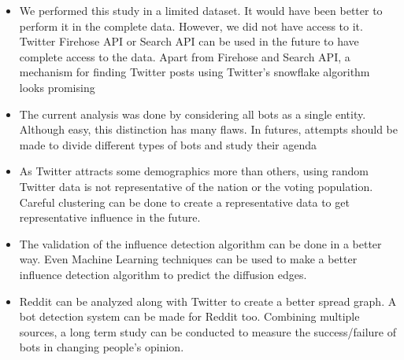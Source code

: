 \documentclass[letterpaper]{article}
\begin{document}
\begin{itemize}
    \item We performed this study in a limited dataset. It would have been better to perform it in the complete data. However, we did not have access to it. 
    Twitter Firehose API or Search API can be used in the future to have complete access to the data. Apart from Firehose and Search API, 
    a mechanism for finding Twitter posts using Twitter's snowflake algorithm looks promising \cite{bettermetrics2019}
    \item The current analysis was done by considering all bots as a single entity. Although easy, this distinction has many flaws. In futures, attempts should be made to 
    divide different types of bots and study their agenda
    \item As Twitter attracts some demographics more than others, using random Twitter data is not representative of the nation or the voting population. 
    Careful clustering can be done to create a representative data to get representative influence in the future.
    \item The validation of the influence detection algorithm can be done in a better way. Even Machine Learning techniques can be used to make a better influence detection algorithm 
    to predict the diffusion edges.
    \item Reddit can be analyzed along with Twitter to create a better spread graph. A bot detection system can be made for Reddit too. Combining multiple sources, a
     long term study can be conducted to measure the success/failure of bots in changing people's opinion.
\end{itemize}



\end{document}

